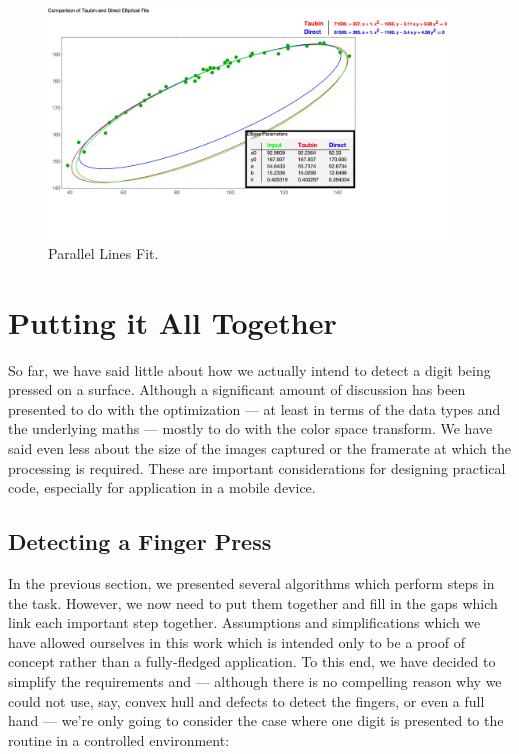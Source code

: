 \begin{figure}[h!]
  \centering
    \includegraphics[width=0.95\textwidth]{Chapter4/Figs/EllipticalFitTest_Taubin_2.jpg}
    \caption{Parallel Lines Fit.}\label{fig:ParallelFit}
\end{figure}

\section{Putting it All Together}\label{sec:PuttingItAllTogether}

So far, we have said little about how we actually intend to detect a digit being pressed on a surface. Although a significant amount of discussion has been presented to do with the optimization --- at least in terms of the data types and the underlying maths --- mostly to do with the color space transform. We have said even less about the size of the images captured or the framerate at which the processing is required. These are important considerations for designing practical code, especially for application in a mobile device.

\subsection{Detecting a Finger Press}\label{sec:DetectingAFingerPress}

In the previous section, we presented several algorithms which perform steps in the task. However, we now need to put them together and fill in the gaps which link each important step together. Assumptions and simplifications which we have allowed ourselves in this work which is intended only to be a proof of concept rather than a fully-fledged application. To this end, we have decided to simplify the requirements and --- although there is no compelling reason why we could not use, say, convex hull and defects to detect the fingers, or even a full hand --- we're only going to consider the case where one digit is presented to the routine in a controlled environment:

